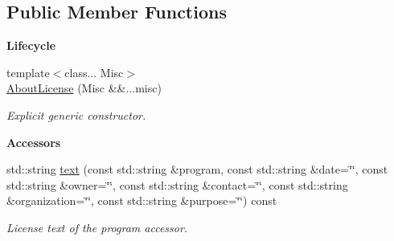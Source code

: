 \subsection*{Public Member Functions}
\begin{Indent}{\bf Lifecycle}\par
\begin{DoxyCompactItemize}
\item 
{\footnotesize template$<$class... Misc$>$ }\\\hyperlink{exceptionmagrathea_1_1AboutLicense_a8fbce27e799834af4aeab373110530ed}{About\-License} (Misc \&\&...misc)
\begin{DoxyCompactList}\small\item\em Explicit generic constructor. \end{DoxyCompactList}\end{DoxyCompactItemize}
\end{Indent}
\begin{Indent}{\bf Accessors}\par
\begin{DoxyCompactItemize}
\item 
std\-::string \hyperlink{exceptionmagrathea_1_1AboutLicense_a27175356904c56241e1db021e63dcc77}{text} (const std\-::string \&program, const std\-::string \&date=\char`\"{}\char`\"{}, const std\-::string \&owner=\char`\"{}\char`\"{}, const std\-::string \&contact=\char`\"{}\char`\"{}, const std\-::string \&organization=\char`\"{}\char`\"{}, const std\-::string \&purpose=\char`\"{}\char`\"{}) const 
\begin{DoxyCompactList}\small\item\em License text of the program accessor. \end{DoxyCompactList}\end{DoxyCompactItemize}
\end{Indent}
